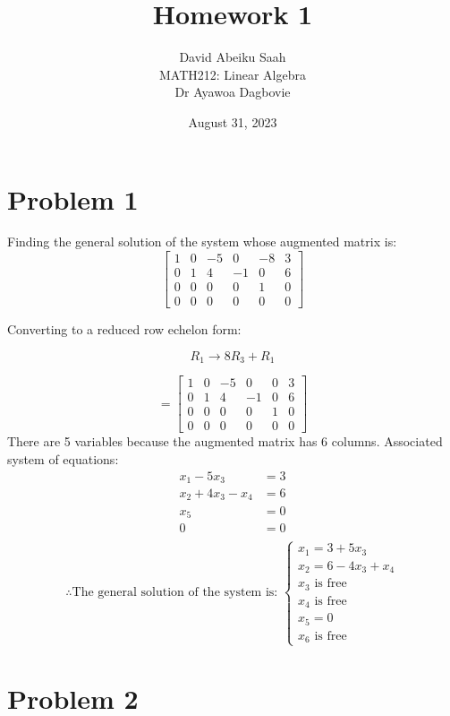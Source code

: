 \documentclass[12pt, a4paper]{article}
\title{
    \textbf{Homework 1} \\ \vspace{1cm}
}
\author{
\vspace*{0.5cm}
    David Abeiku Saah \\ \vspace{0.4cm}
    MATH212: Linear Algebra \\ \vspace{0.5cm}
    Dr Ayawoa Dagbovie \\
}
\date{August 31, 2023}
\begin{document}
\maketitle

\newpage

\section*{Problem 1}

Finding the general solution of the system whose augmented matrix is:
\[
\begin{bmatrix}
    1 & 0 & -5 & 0 & -8 & 3 \\
    0 & 1 & 4 & -1 & 0 & 6 \\
    0 & 0 & 0 & 0 & 1 & 0 \\
    0 & 0 & 0 & 0 & 0 & 0
\end{bmatrix}
\]

Converting to a reduced row echelon form:

\[R_1 \rightarrow 8R_3 + R_1\]

\[
= \begin{bmatrix}
    1 & 0 & -5 & 0 & 0 & 3 \\
    0 & 1 & 4 & -1 & 0 & 6 \\
    0 & 0 & 0 & 0 & 1 & 0 \\
    0 & 0 & 0 & 0 & 0 & 0
\end{bmatrix}
\]
There are 5 variables because the augmented matrix has 6 columns.
\linebreak
Associated system of equations:
\begin{align*}
    x_1 - 5x_3 &= 3 \\
    x_2 + 4x_3 - x_4 &= 6 \\
    x_5 &= 0 \\
    0 &= 0 \\
\end{align*}
\[
\therefore \text{The general solution of the system is: }
\begin{cases}
    x_1 = 3 + 5x_3  \\
    x_2 = 6 - 4x_3 + x_4 \\
    x_3 \text{ is free} \\
    x_4 \text{ is free} \\
    x_5 = 0 \\
    x_6 \text{ is free}
\end{cases}
\]

\pagebreak

\section*{Problem 2}
\end{document}
